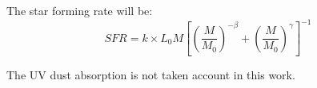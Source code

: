 The star forming rate will be:
  \begin{equation}
  SFR = k \times L_{0} M \left[ \left( \frac{M}{M_0}\right)^{-\beta} 
		   + \left( \frac{M}{M_0}\right)^{\gamma} 
               \right]^{-1}
  \end{equation}

The UV dust absorption \citep{kennicutt09} is not taken account in this work.

